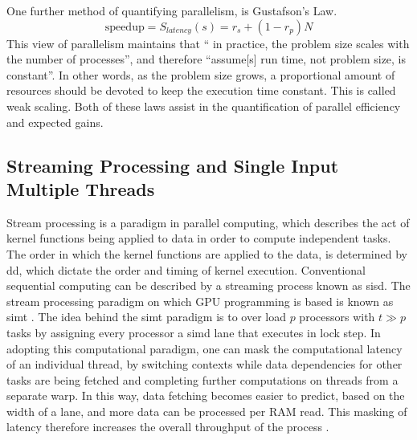 One further method of quantifying parallelism, is Gustafson's Law\cite{Gustafson}.
%
\begin{equation}
  \tag{Gustofson's Law}
  \text{speedup} = S_{latency}(s) = r_{s} + (1 - r_{p})N
\end{equation}
%
This view of parallelism maintains that `` in practice, the problem
size scales with the number of processes'', and therefore
``assume[s] run time, not problem size, is constant''.
In other words, as the problem size grows, a proportional
amount of resources should be devoted to keep the execution time constant.  This
is called weak scaling.
Both of these laws assist in the quantification of parallel efficiency and
expected gains.

\subsection{Streaming Processing and Single Input Multiple Threads}
Stream processing is a paradigm in parallel computing, which describes the act
of kernel functions being applied to data in order to compute independent tasks.
The order in which the kernel functions are applied to the data, is determined by
\gls{dd}, which dictate the order and timing of kernel execution. Conventional
sequential computing can be described by a streaming process known as \gls{sisd}.
The stream processing paradigm on which GPU programming is based is known as \gls{simt}
 \cite{advancedtopics}.  The idea behind the \gls{simt} paradigm is to over load
 $p$ processors with $t \gg p$ tasks by assigning every processor a \gls{simd} lane
 that executes in lock step.  In adopting this computational paradigm, one can mask
 the computational latency of an individual thread, by switching contexts while
 data dependencies for other tasks are being fetched and
 completing further computations on threads from a separate warp.  In this way,
 data fetching becomes easier to predict, based on the width of a lane, and more
 data can be processed per \gls{RAM} read.   This masking of latency therefore increases
 the overall throughput of the process \cite{advancedtopics}.


